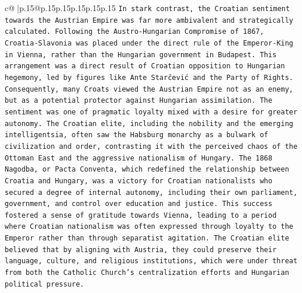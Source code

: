 \documentclass{article}
\begin{document}
{\begin{supertabular}{c@{$\;$}|p{.15\linewidth}@{}p{.15\linewidth}p{.15\linewidth}p{.15\linewidth}p{.15\linewidth}p{.15\linewidth}}
{{{\texttt{In stark contrast, the Croatian sentiment towards the Austrian Empire was far more ambivalent and strategically calculated. Following the Austro{-}Hungarian Compromise of 1867, Croatia{-}Slavonia was placed under the direct rule of the Emperor{-}King in Vienna, rather than the Hungarian government in Budapest. This arrangement was a direct result of Croatian opposition to Hungarian hegemony, led by figures like Ante Starčević and the Party of Rights. Consequently, many Croats viewed the Austrian Empire not as an enemy, but as a potential protector against Hungarian assimilation. The sentiment was one of pragmatic loyalty mixed with a desire for greater autonomy. The Croatian elite, including the nobility and the emerging intelligentsia, often saw the Habsburg monarchy as a bulwark of civilization and order, contrasting it with the perceived chaos of the Ottoman East and the aggressive nationalism of Hungary. The 1868 Nagodba, or Pacta Conventa, which redefined the relationship between Croatia and Hungary, was a victory for Croatian nationalists who secured a degree of internal autonomy, including their own parliament, government, and control over education and justice. This success fostered a sense of gratitude towards Vienna, leading to a period where Croatian nationalism was often expressed through loyalty to the Emperor rather than through separatist agitation. The Croatian elite believed that by aligning with Austria, they could preserve their language, culture, and religious institutions, which were under threat from both the Catholic Church's centralization efforts and Hungarian political pressure.} \\
\\ 
}}}
\end{supertabular}}
\end{document}
